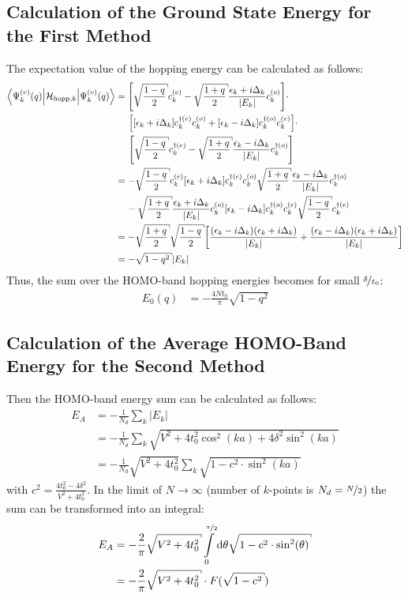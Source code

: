 \subsection*{Calculation of the Ground State Energy for the First Method}
The expectation value of the hopping energy can be calculated as follows:
\begin{align}
\left\langle\Psi_k^{(v)}(q)\Big|\mathcal{H}_{\text{hopp},k}\Big|\Psi_k^{(v)}(q)\right\rangle &= \left[\sqrt{\frac{1-q}{2}}c_k^{(e)}- \sqrt{\frac{1+q}{2}}\frac{\epsilon_k + i \Delta_k}{|E_k|}c_{k}^{(o)}\right]\cdot\nonumber\\
&\hspace*{0.5cm}\left[
\left[\epsilon_k + i\Delta_k\right]c_{k}^{\dagger(e)}c_{k}^{(o)} + \left[\epsilon_k-i\Delta_k \right]	c_{k}^{\dagger(o)}c_{k}^{(e)}
\right]\cdot\nonumber\\
&\hspace*{0.5cm}\left[\sqrt{\frac{1-q}{2}}c_k^{\dagger(e)}- \sqrt{\frac{1+q}{2}}\frac{\epsilon_k - i \Delta_k}{|E_k|}c_{k}^{\dagger(o)}\right]\\
&=-\sqrt{\frac{1-q}{2}}c_k^{(e)}\left[\epsilon_k+i\Delta_k \right]	c_{k}^{\dagger(e)}c_{k}^{(o)}\sqrt{\frac{1+q}{2}}\frac{\epsilon_k - i \Delta_k}{|E_k|}c_{k}^{\dagger(o)}\nonumber\\
&\hspace*{0.4cm}-\sqrt{\frac{1+q}{2}}\frac{\epsilon_k + i \Delta_k}{|E_k|}c_{k}^{(o)}\left[\epsilon_k - i\Delta_k\right]c_{k}^{\dagger(o)}c_{k}^{(e)}\sqrt{\frac{1-q}{2}}c_k^{\dagger(e)}\\
&=-\sqrt{\frac{1+q}{2}}\sqrt{\frac{1-q}{2}}\left[\frac{(\epsilon_k-i\Delta_k)(\epsilon_k+i\Delta_k)}{|E_k|}+\frac{(\epsilon_k-i\Delta_k)(\epsilon_k+i\Delta_k)}{|E_k|}\right]\\
&= -\sqrt{1-q^2} |E_k|
\end{align}
Thus, the sum over the HOMO-band hopping energies becomes for small $\nicefrac{\delta}{t_0}$:
\begin{align}
E_0(q) &= -\frac{4Nt_0}{\pi} \sqrt{1-q^2}
\end{align}
\subsection*{Calculation of the Average HOMO-Band Energy for the Second Method}
Then the HOMO-band energy sum can be calculated as follows:
\begin{align}
E_A &= -\frac{1}{N_d}\sum_k |E_k|\\
&= -\frac{1}{N_d}\sum_k \sqrt{V^2 + 4t_0^2\cos^2(ka) + 4 \delta^2\sin^2(ka)}\\
&= -\frac{1}{N_d}\sqrt{V^2 + 4t_0^2}\sum_k \sqrt{1 - c^2 \cdot \sin^2(ka)}
\end{align} 
with $c^2 = \frac{4t_0^2-4\delta^2}{V^2+4t_0^2}$. In the limit of $N \to \infty$ (number of $k$-points is $N_d = \nicefrac{N}{2}$) the sum can be transformed into an integral:
\begin{align}
E_A &= -\frac{2}{\pi} \sqrt{V^2+4t_0^2} \int\limits_{0}^{\nicefrac{\pi}{2}} \text{d}\theta \sqrt{1 - c^2 \cdot \sin^2(\theta)}\\
&= -\frac{2}{\pi} \sqrt{V^2+4t_0^2} \cdot F(\sqrt{1-c^2}) 
\end{align}

